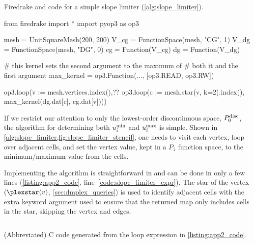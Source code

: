 \documentclass[thesis]{subfiles}
\begin{document}
\begin{listing}
  \centering
  \caption{
    Firedrake and  code for a simple slope limiter (\cref{alg:slope_limiter}).
  }
  \begin{minipage}{.9\textwidth}
    \begin{pyalg2}
      from firedrake import *
      import pyop3 as op3

      mesh = UnitSquareMesh(200, 200)
      V_cg = FunctionSpace(mesh, "CG", 1)
      V_dg = FunctionSpace(mesh, "DG", 0)
      cg = Function(V_cg)
      dg = Function(V_dg)

      # this kernel sets the second argument to the maximum of
      # both it and the first argument
      max_kernel = op3.Function(..., [op3.READ, op3.RW])

      op3.loop(v := mesh.vertices.index(),?\label{code:slope_limiter_expr}?
               op3.loop(c := mesh.star(v, k=2).index(),
                        max_kernel(dg.dat[c], cg.dat[v])))
    \end{pyalg2}
  \end{minipage}
  \label{listing:app2_code}
\end{listing}

If we restrict our attention to only the lowest-order discontinuous space, $P_0^{\textnormal{disc}}$, the algorithm for determining both $u_i^{\textnormal{min}}$ and $u_i^{\textnormal{max}}$ is simple.
Shown in \cref{alg:slope_limiter,fig:slope_limiter_stencil}, one needs to visit each vertex, loop over adjacent cells, and set the vertex value, kept in a $P_1$ function space, to the minimum/maximum value from the cells.

Implementing the algorithm is straightforward in  and can be done in only a few lines (\cref{listing:app2_code}, line~\ref{code:slope_limiter_expr}).
The star of the vertex ($\plexstar(v)$, \cref{sec:dmplex_queries}) is used to identify adjacent cells with the extra keyword argument  used to ensure that the returned map only includes cells in the star, skipping the vertex and edges.

\begin{listing}
  \centering
  \begin{minipage}{.9\textwidth}
    \inputminted[linenos,escapeinside=??]{c}{./experiments/slope_limiter/c_code_tidy.c}
  \end{minipage}
  \caption{(Abbreviated) C code generated from the loop expression in \cref{listing:app2_code}.}
  \label{listing:app2_codegen}
\end{listing}
\end{document}
